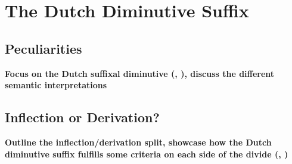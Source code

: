 \section{The Dutch Diminutive Suffix}
\label{sec:dutchdimsuffix}
\subsection{Peculiarities}
\textbf{Focus on the Dutch suffixal diminutive (\cite{VanderHulst+2008}, \cite{DeBelder+2022}), discuss the different semantic interpretations}
\subsection{Inflection or Derivation?}
\textbf{Outline the inflection/derivation split, showcase how the Dutch diminutive suffix fulfills some criteria on each side of the divide (\cite{Schneider+2003}, \cite{Booij+2000})}
